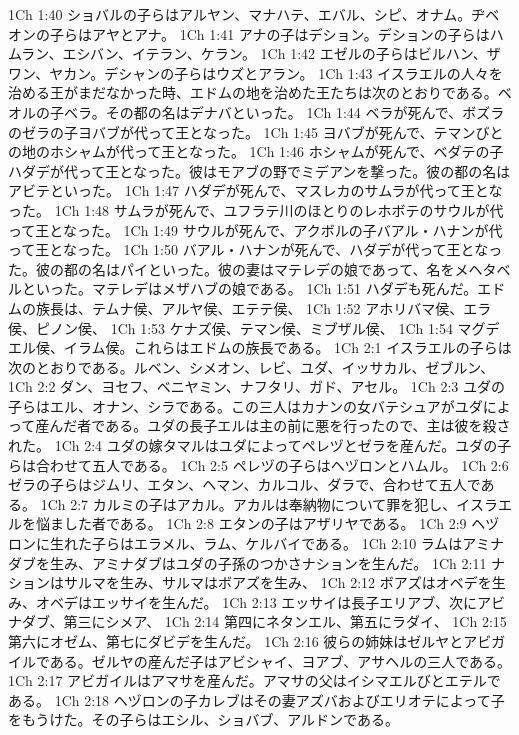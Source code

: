 1Ch 1:40  ショバルの子らはアルヤン、マナハテ、エバル、シピ、オナム。ヂベオンの子らはアヤとアナ。
1Ch 1:41  アナの子はデション。デションの子らはハムラン、エシバン、イテラン、ケラン。
1Ch 1:42  エゼルの子らはビルハン、ザワン、ヤカン。デシャンの子らはウズとアラン。
1Ch 1:43  イスラエルの人々を治める王がまだなかった時、エドムの地を治めた王たちは次のとおりである。ベオルの子ベラ。その都の名はデナバといった。
1Ch 1:44  ベラが死んで、ボズラのゼラの子ヨバブが代って王となった。
1Ch 1:45  ヨバブが死んで、テマンびとの地のホシャムが代って王となった。
1Ch 1:46  ホシャムが死んで、ベダテの子ハダデが代って王となった。彼はモアブの野でミデアンを撃った。彼の都の名はアビテといった。
1Ch 1:47  ハダデが死んで、マスレカのサムラが代って王となった。
1Ch 1:48  サムラが死んで、ユフラテ川のほとりのレホボテのサウルが代って王となった。
1Ch 1:49  サウルが死んで、アクボルの子バアル・ハナンが代って王となった。
1Ch 1:50  バアル・ハナンが死んで、ハダデが代って王となった。彼の都の名はパイといった。彼の妻はマテレデの娘であって、名をメヘタベルといった。マテレデはメザハブの娘である。
1Ch 1:51  ハダデも死んだ。エドムの族長は、テムナ侯、アルヤ侯、エテテ侯、
1Ch 1:52  アホリバマ侯、エラ侯、ピノン侯、
1Ch 1:53  ケナズ侯、テマン侯、ミブザル侯、
1Ch 1:54  マグデエル侯、イラム侯。これらはエドムの族長である。
1Ch 2:1  イスラエルの子らは次のとおりである。ルベン、シメオン、レビ、ユダ、イッサカル、ゼブルン、
1Ch 2:2  ダン、ヨセフ、ベニヤミン、ナフタリ、ガド、アセル。
1Ch 2:3  ユダの子らはエル、オナン、シラである。この三人はカナンの女バテシュアがユダによって産んだ者である。ユダの長子エルは主の前に悪を行ったので、主は彼を殺された。
1Ch 2:4  ユダの嫁タマルはユダによってペレヅとゼラを産んだ。ユダの子らは合わせて五人である。
1Ch 2:5  ペレヅの子らはヘヅロンとハムル。
1Ch 2:6  ゼラの子らはジムリ、エタン、ヘマン、カルコル、ダラで、合わせて五人である。
1Ch 2:7  カルミの子はアカル。アカルは奉納物について罪を犯し、イスラエルを悩ました者である。
1Ch 2:8  エタンの子はアザリヤである。
1Ch 2:9  ヘヅロンに生れた子らはエラメル、ラム、ケルバイである。
1Ch 2:10  ラムはアミナダブを生み、アミナダブはユダの子孫のつかさナションを生んだ。
1Ch 2:11  ナションはサルマを生み、サルマはボアズを生み、
1Ch 2:12  ボアズはオベデを生み、オベデはエッサイを生んだ。
1Ch 2:13  エッサイは長子エリアブ、次にアビナダブ、第三にシメア、
1Ch 2:14  第四にネタンエル、第五にラダイ、
1Ch 2:15  第六にオゼム、第七にダビデを生んだ。
1Ch 2:16  彼らの姉妹はゼルヤとアビガイルである。ゼルヤの産んだ子はアビシャイ、ヨアブ、アサヘルの三人である。
1Ch 2:17  アビガイルはアマサを産んだ。アマサの父はイシマエルびとエテルである。
1Ch 2:18  ヘヅロンの子カレブはその妻アズバおよびエリオテによって子をもうけた。その子らはエシル、ショバブ、アルドンである。
